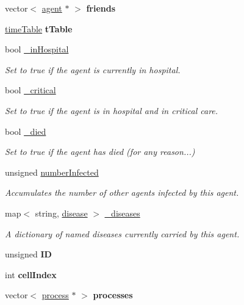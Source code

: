 \begin{DoxyCompactItemize}
vector$<$ \mbox{\hyperlink{classagent}{agent}} $\ast$ $>$ {\bfseries friends}
\item 
\mbox{\label{classagent_a0a669d47bb2f6781ea5ec1f2cdfdd4e2}} 
\mbox{\hyperlink{structtimeTable}{time\+Table}} {\bfseries t\+Table}
\item 
\mbox{\label{classagent_a4a2f231b103bbe13452570921e296ea1}} 
bool \mbox{\hyperlink{classagent_a4a2f231b103bbe13452570921e296ea1}{\+\_\+in\+Hospital}}
\begin{DoxyCompactList}\small\item\em Set to true if the agent is currently in hospital. \end{DoxyCompactList}\item 
\mbox{\label{classagent_a9803ed96415b37e5ad091848a53e1944}} 
bool \mbox{\hyperlink{classagent_a9803ed96415b37e5ad091848a53e1944}{\+\_\+critical}}
\begin{DoxyCompactList}\small\item\em Set to true if the agent is in hospital and in critical care. \end{DoxyCompactList}\item 
\mbox{\label{classagent_a0d09f2c676410b866a348291900ee520}} 
bool \mbox{\hyperlink{classagent_a0d09f2c676410b866a348291900ee520}{\+\_\+died}}
\begin{DoxyCompactList}\small\item\em Set to true if the agent has died (for any reason...) \end{DoxyCompactList}\item 
unsigned \mbox{\hyperlink{classagent_a4145c90d534f84deb22a93560809134c}{number\+Infected}}
\begin{DoxyCompactList}\small\item\em Accumulates the number of other agents infected by this agent. \end{DoxyCompactList}\item 
map$<$ string, \mbox{\hyperlink{classdisease}{disease}} $>$ \mbox{\hyperlink{classagent_a2352342e95bc77041c07c0dafdfb7cd2}{\+\_\+diseases}}
\begin{DoxyCompactList}\small\item\em A dictionary of named diseases currently carried by this agent. \end{DoxyCompactList}\item 
\mbox{\label{classagent_a7f99e11ffb5c042be84e2917cba7af3a}} 
unsigned {\bfseries ID}
\item 
\mbox{\label{classagent_a3db995cae037474ae4bf7adcb7cd44cc}} 
int {\bfseries cell\+Index}
\item 
\mbox{\label{classagent_a13305f6e66e992cf1c6ffa7b027c4201}} 
vector$<$ \mbox{\hyperlink{classprocess}{process}} $\ast$ $>$ {\bfseries processes}
\end{DoxyCompactItemize}
